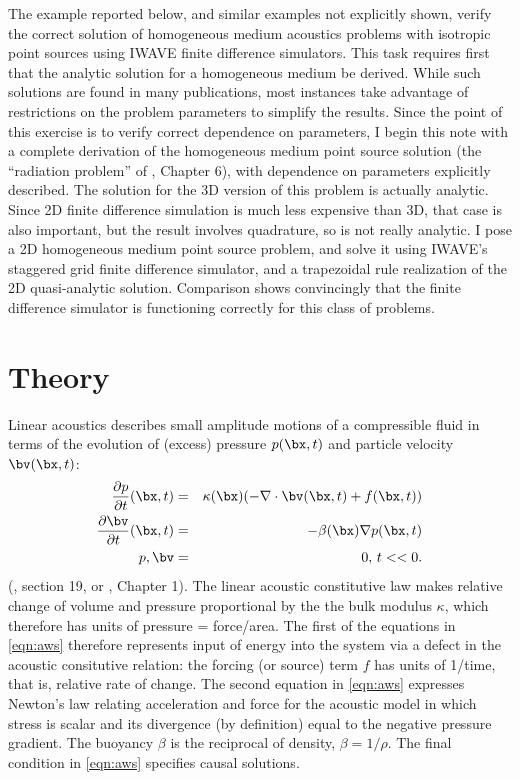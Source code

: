 The example reported below, and similar examples not explicitly shown,
verify the correct solution of homogeneous medium acoustics problems
with isotropic point sources using IWAVE finite difference
simulators. This task requires first that the
analytic solution for a homogeneous medium be derived. While such
solutions are found in many publications, most instances take
advantage of restrictions on the problem parameters to simplify the
results. Since the point of this exercise is to verify correct
dependence on parameters, I begin this note with a complete derivation
of the homogeneous medium point source solution (the ``radiation
problem'' of \cite{CourHil:62}, Chapter 6), with dependence on
parameters explicitly described. The solution for the 3D version of
this problem is actually analytic. Since 2D finite difference
simulation is much less expensive than 3D, that case is also
important, but the result involves quadrature, so is not really
analytic. I pose a 2D homogeneous medium point source problem, and
solve it using IWAVE's staggered grid finite difference simulator, and
a trapezoidal rule realization of the 2D quasi-analytic
solution. Comparison shows convincingly that the finite difference
simulator is functioning correctly for this class of problems.

\section{Theory}
Linear acoustics describes small amplitude motions of a compressible fluid in terms of the evolution of (excess) pressure $p(\bx,t)$ and particle velocity $\bv(\bx,t)$: 
\begin{eqnarray}
\label{eqn:aws}
\frac{\partial p}{\partial t}(\bx,t) & = &\kappa(\bx) (-\nabla \cdot \bv(\bx,t) + f(\bx,t))\nonumber\\
\frac{\partial \bv}{\partial t}(\bx,t) & = & -\beta(\bx) \nabla p(\bx,t)\nonumber\\
p, \bv &=& 0,\, t << 0.
\end{eqnarray}
(\cite{gur81}, section 19, or \cite{Frie:58}, Chapter 1). The linear acoustic constitutive law makes relative change of volume and pressure proportional by the the bulk modulus $\kappa$, which therefore has units of pressure = force/area. The first of the equations in \ref{eqn:aws} therefore represents input of energy into the system via a defect in the acoustic consitutive relation: the forcing (or source) term $f$ has units of 1/time, that is, relative rate of change. The second equation in \ref{eqn:aws} expresses Newton's law relating acceleration and force for the acoustic model in which stress is scalar and its divergence (by definition) equal to the negative pressure gradient. The buoyancy $\beta$ is the reciprocal of density, $\beta=1/\rho$. The final condition in \ref{eqn:aws} specifies causal solutions.

